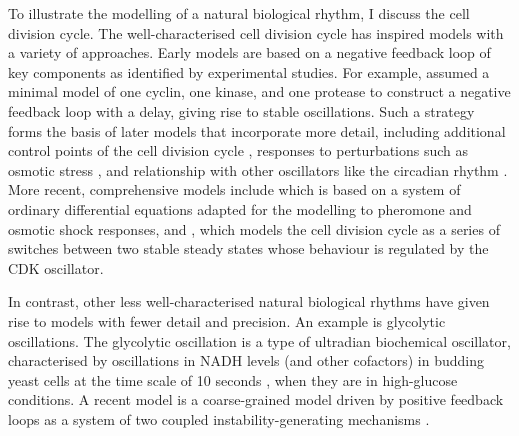 To illustrate the modelling of a natural biological rhythm, I discuss the cell division cycle.
The well-characterised cell division cycle has inspired models with a variety of approaches.
Early models are based on a negative feedback loop of key components as identified by experimental studies.
For example, \textcite{goldbeterMinimalCascadeModel1991} assumed a minimal model of one cyclin, one kinase, and one protease to construct a negative feedback loop with a delay, giving rise to stable oscillations.
Such a strategy forms the basis of later models that incorporate more detail, including additional control points of the cell division cycle \parencite{chenIntegrativeAnalysisCell2004}, responses to perturbations such as osmotic stress \parencite{adroverTimeDependentQuantitativeMulticomponent2011}, and relationship with other oscillators like the circadian rhythm \parencite{gerardEntrainmentMammalianCell2012, charvinForcedPeriodicExpression2009, droinLowdimensionalDynamicsTwo2019}.
More recent, comprehensive models include \textcite{adlerYeastCellCycle2022} which is based on a system of ordinary differential equations adapted for the modelling to pheromone and osmotic shock responses, and \textcite{novakMitoticKinaseOscillation2022}, which models the cell division cycle as a series of switches between two stable steady states whose behaviour is regulated by the CDK oscillator.

In contrast, other less well-characterised natural biological rhythms have given rise to models with fewer detail and precision.
An example is glycolytic oscillations.
The glycolytic oscillation is a type of ultradian biochemical oscillator, characterised by oscillations in NADH levels (and other cofactors) in budding yeast cells at the time scale of 10 seconds \parencite{doddLiveCellImaging2017, lloydSaccharomycesCerevisiaeOscillatory2019, olsenOscillationsYeastGlycolysis2021}, when they are in high-glucose conditions.
A recent model is a coarse-grained model
driven by positive feedback loops as a system of two coupled instability-generating mechanisms \parencite{goldbeterMultisynchronizationOtherPatterns}.

